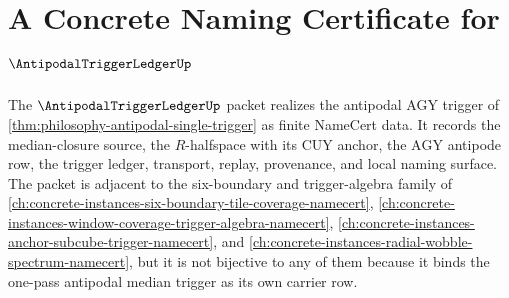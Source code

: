 \chapter{A Concrete Naming Certificate for $\AntipodalTriggerLedgerUp$}
\label{ch:concrete-instances-antipodal-trigger-ledger-namecert}

The $\AntipodalTriggerLedgerUp$ packet realizes the antipodal AGY trigger of \autoref{thm:philosophy-antipodal-single-trigger} as finite NameCert data. It records the median-closure source, the $R$-halfspace with its $\mathrm{CUY}$ anchor, the $\mathrm{AGY}$ antipode row, the trigger ledger, transport, replay, provenance, and local naming surface. The packet is adjacent to the six-boundary and trigger-algebra family of \autoref{ch:concrete-instances-six-boundary-tile-coverage-namecert}, \autoref{ch:concrete-instances-window-coverage-trigger-algebra-namecert}, \autoref{ch:concrete-instances-anchor-subcube-trigger-namecert}, and \autoref{ch:concrete-instances-radial-wobble-spectrum-namecert}, but it is not bijective to any of them because it binds the one-pass antipodal median trigger as its own carrier row.

